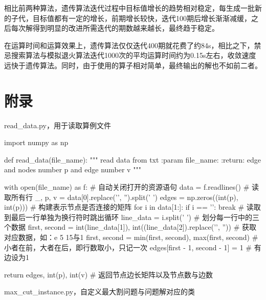 \documentclass{article}
\begin{document}
    相比前两种算法，遗传算法迭代过程中目标值增长的趋势相对稳定，每生成一批新的子代，目标值都有一定的增长，前期增长较快，迭代100期后增长渐渐减缓，之后每次解得到明显的改进所需迭代的期数越来越长，最终趋于稳定。

    在运算时间和运算效果上，遗传算法仅仅迭代400期就花费了约84s，相比之下，禁忌搜索算法与模拟退火算法迭代1000次的平均运算时间约为0.15s左右，收敛速度远快于遗传算法。同时，由于使用的算子相对简单，最终输出的解也不如前二者。

    \newpage
    \section{附录}
    \noindent
    read\_data.py，用于读取算例文件
    \begin{python}
    import numpy as np

    def read_data(file_name):
        """
        read data from txt
        :param file_name:
        :return: edge and nodes number p and edge number v
        """

        with open(file_name) as f:  # 自动关闭打开的资源语句
            data = f.readlines()  # 读取所有行
        _, p, v = data[0].replace('\n', '').split(' ')
        edges = np.zeros((int(p), int(p)))  # 构建表示节点是否连接的矩阵
        for i in data[1:]:
            if i == '\n':
                break  # 读取到最后一行单独为换行符时跳出循环
            line_data = i.split(' ')  # 划分每一行中的三个数据
            first, second = int(line_data[1]), int((line_data[2]).replace('\n', ''))  # 获取对应数据，如：e 5 15与1
            first, second = min(first, second), max(first, second)  # 小者在前，大者在后，即行数取小，只记一次
            edges[first - 1, second - 1] = 1  # 有边设为1

        return edges, int(p), int(v)  # 返回节点边长矩阵以及节点数与边数
    \end{python}
    max\_cut\_instance.py，自定义最大割问题与问题解对应的类
\end{document}
